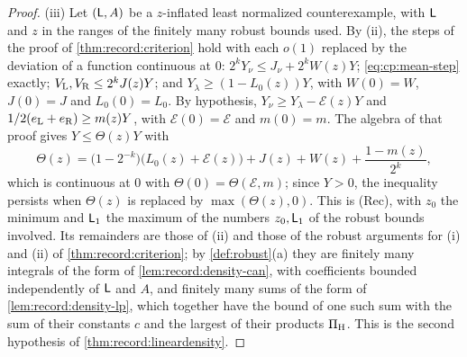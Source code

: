 \begin{proof}
(iii) Let $(\Lsc,A)$ be a $z$-inflated least normalized counterexample, with
$\Lsc$ and $z$ in the ranges of the finitely many robust bounds used. By (ii),
the steps of the proof of \cref{thm:record:criterion} hold with each $o(1)$
replaced by the deviation of a function continuous at $0$:
$2^kY_\nu\le J_\nu+2^kW(z)Y$; \eqref{eq:cp:mean-step} exactly; $V_{\rm L},V_{\rm
R}\le2^kJ(z)Y$; and $Y_\lambda\ge(1-L_0(z))Y$, with $W(0)=W$, $J(0)=J$ and
$L_0(0)=L_0$. By hypothesis, $Y_\nu\ge Y_\lambda-\mathcal E(z)Y$ and
$\frac12(e_{\rm L}+e_{\rm R})\ge m(z)Y$, with $\mathcal E(0)=\mathcal E$ and
$m(0)=m$. The algebra of that proof gives $Y\le\Theta(z)Y$ with
\[
 \Theta(z)=\bigl(1-2^{-k}\bigr)\bigl(L_0(z)+\mathcal E(z)\bigr)+J(z)+W(z)
 +\frac{1-m(z)}{2^k},
\]
which is continuous at $0$ with $\Theta(0)=\Theta(\mathcal E,m)$; since
$Y>0$, the inequality persists when $\Theta(z)$ is replaced by
$\max(\Theta(z),0)$. This is (Rec), with $z_0$ the minimum and $\Lsc_1$ the maximum of the numbers $z_0,\Lsc_1$ of the robust bounds involved. Its
remainders are those of (ii) and those of the robust arguments for (i) and
(ii) of \cref{thm:record:criterion}; by \cref{def:robust}(a) they are
finitely many integrals of the form of \cref{lem:record:density-can}, with
coefficients bounded independently of $\Lsc$ and $A$, and finitely many sums
of the form of \cref{lem:record:density-lp}, which together have the bound of
one such sum with the sum of their constants $c$ and the largest of their
products $\Pi_{\rm H}$. This is the second hypothesis of
\cref{thm:record:lineardensity}.
\end{proof}

